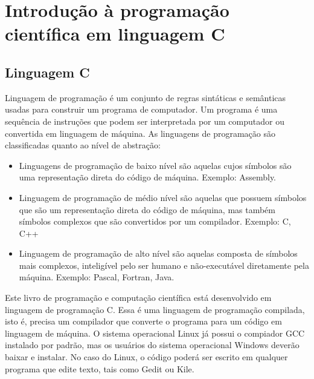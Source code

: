 
\chapter{Introdução à programação científica em linguagem C}
\section{Linguagem C}
Linguagem de programação é um conjunto de regras sintáticas e semânticas usadas para construir um programa de computador. Um programa é uma sequência de instruções que podem ser interpretada por um computador ou convertida em linguagem de máquina.
As linguagens de programação são classificadas quanto ao nível de abstração:
\begin{itemize}
\item Linguagens de programação de baixo nível são aquelas cujos símbolos são uma representação direta do código de máquina. Exemplo: Assembly.

\item Linguagem de programação de médio nível são aquelas que possuem símbolos que são um representação direta do código de máquina, mas também símbolos complexos que são convertidos por um compilador. Exemplo: C, C++

\item Linguagem de programação de alto nível são aquelas composta de símbolos mais complexos, inteligível pelo ser humano e não-executável diretamente pela máquina. Exemplo: Pascal, Fortran, Java.
\end{itemize}

Este livro de programação e computação científica está desenvolvido em linguagem de programação C. Essa é uma linguagem de programação compilada, isto é, precisa um compilador que converte o programa para um código em linguagem de máquina. O sistema operacional Linux já possui o compiador GCC instalado por padrão, mas os usuários do sistema operacional Windows deverão baixar e instalar. No caso do Linux, o código poderá ser escrito em qualquer programa que edite texto, tais como Gedit ou Kile.

